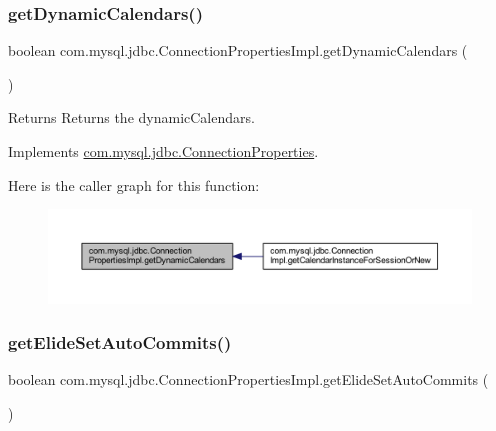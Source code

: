 \subsubsection{\texorpdfstring{get\+Dynamic\+Calendars()}{getDynamicCalendars()}}
{\footnotesize\ttfamily boolean com.\+mysql.\+jdbc.\+Connection\+Properties\+Impl.\+get\+Dynamic\+Calendars (\begin{DoxyParamCaption}{ }\end{DoxyParamCaption})}

\begin{DoxyReturn}{Returns}
Returns the dynamic\+Calendars. 
\end{DoxyReturn}


Implements \mbox{\hyperlink{interfacecom_1_1mysql_1_1jdbc_1_1_connection_properties_aa8a465589df5cfff61d5903b1cb6fb85}{com.\+mysql.\+jdbc.\+Connection\+Properties}}.

Here is the caller graph for this function\+:\nopagebreak
\begin{figure}[H]
\begin{center}
\leavevmode
\includegraphics[width=350pt]{classcom_1_1mysql_1_1jdbc_1_1_connection_properties_impl_ace467e9ed5808a6a4d40e65fe10480f4_icgraph}
\end{center}
\end{figure}
\mbox{\label{classcom_1_1mysql_1_1jdbc_1_1_connection_properties_impl_af85a865c522e1a674ab78c2bbfa2d738}} 
\subsubsection{\texorpdfstring{get\+Elide\+Set\+Auto\+Commits()}{getElideSetAutoCommits()}}
{\footnotesize\ttfamily boolean com.\+mysql.\+jdbc.\+Connection\+Properties\+Impl.\+get\+Elide\+Set\+Auto\+Commits (\begin{DoxyParamCaption}{ }\end{DoxyParamCaption})}

